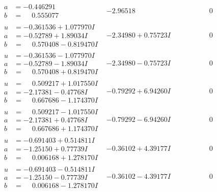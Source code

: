 \documentclass[1p]{elsarticle_modified}
\theoremstyle{definition}
\begin{document}
$$\begin{array}{c|c|c}
\begin{aligned}
a &= -0.446291\phantom{ +0.000000I} \\
b &= \phantom{-}0.555077\phantom{ +0.000000I}\end{aligned}
 & -2.96518\phantom{ +0.000000I} & \phantom{-0.000000 } 0 \\ \hline\begin{aligned}
u &= -0.361536 + 1.077970 I \\
a &= -0.52789 + 1.89034 I \\
b &= \phantom{-}0.570408 - 0.819470 I\end{aligned}
 & -2.34980 + 0.75723 I & \phantom{-0.000000 } 0 \\ \hline\begin{aligned}
u &= -0.361536 - 1.077970 I \\
a &= -0.52789 - 1.89034 I \\
b &= \phantom{-}0.570408 + 0.819470 I\end{aligned}
 & -2.34980 - 0.75723 I & \phantom{-0.000000 } 0 \\ \hline\begin{aligned}
u &= \phantom{-}0.509217 + 1.017550 I \\
a &= -2.17381 - 0.47768 I \\
b &= \phantom{-}0.667686 - 1.174370 I\end{aligned}
 & -0.79292 + 6.94260 I & \phantom{-0.000000 } 0 \\ \hline\begin{aligned}
u &= \phantom{-}0.509217 - 1.017550 I \\
a &= -2.17381 + 0.47768 I \\
b &= \phantom{-}0.667686 + 1.174370 I\end{aligned}
 & -0.79292 - 6.94260 I & \phantom{-0.000000 } 0 \\ \hline\begin{aligned}
u &= -0.691403 + 0.514811 I \\
a &= -1.25150 + 0.77739 I \\
b &= \phantom{-}0.006168 + 1.278170 I\end{aligned}
 & -0.36102 + 4.39177 I & \phantom{-0.000000 } 0 \\ \hline\begin{aligned}
u &= -0.691403 - 0.514811 I \\
a &= -1.25150 - 0.77739 I \\
b &= \phantom{-}0.006168 - 1.278170 I\end{aligned}
 & -0.36102 - 4.39177 I & \phantom{-0.000000 } 0 \\ \hline\begin{aligned}

\end{aligned}
\end{array}$$
\end{document}
